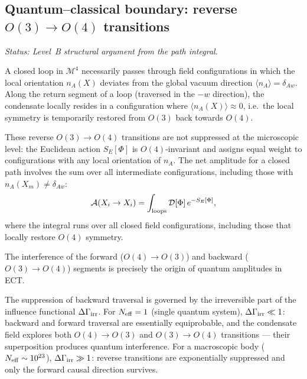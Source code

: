 \documentclass[11pt,a4paper]{article}
\numberwithin{equation}{section}
\begin{document}
\subsection{Quantum--classical boundary: reverse $O(3)\to O(4)$ transitions}
\label{sec:quantum_classical_boundary}

\textit{Status: Level~B structural argument from the path integral.}

A closed loop in $\mathcal{M}^4$ necessarily passes through field
configurations in which the local orientation $n_A(X)$ deviates from
the global vacuum direction $\langle n_A\rangle = \delta_{Aw}$.
Along the return segment of a loop (traversed in the $-w$ direction),
the condensate locally resides in a configuration where
$\langle n_A(X)\rangle\approx 0$, i.e.\ the local symmetry is
temporarily restored from $O(3)$ back towards $O(4)$.

These reverse $O(3)\!\to\!O(4)$ transitions are not suppressed at
the microscopic level: the Euclidean action $S_E[\Phi]$ is
$O(4)$-invariant and assigns equal weight to configurations with any
local orientation of $n_A$.
The net amplitude for a closed path involves the sum over
all intermediate configurations, including those with
$n_A(X_m) \neq \delta_{Aw}$:
\begin{equation}
  \label{eq:loop_sum_O4}
  \mathcal{A}(X_i \to X_i) = \int_{\rm loops} \mathcal{D}[\Phi]\,
  e^{-S_E[\Phi]},
\end{equation}
where the integral runs over all closed field configurations, including
those that locally restore $O(4)$ symmetry.

The interference of the forward ($O(4)\!\to\!O(3)$) and backward
($O(3)\!\to\!O(4)$) segments is precisely the origin of quantum
amplitudes in ECT.

The suppression of backward traversal is governed by the irreversible
part of the influence functional $\Delta\Gamma_{\rm irr}$.
For $N_{\rm eff}=1$ (single quantum system),
$\Delta\Gamma_{\rm irr}\ll1$:
backward and forward traversal are essentially equiprobable, and the
condensate field explores both $O(4)\!\to\!O(3)$ and
$O(3)\!\to\!O(4)$ transitions --- their superposition produces
quantum interference.
For a macroscopic body ($N_{\rm eff}\sim10^{23}$),
$\Delta\Gamma_{\rm irr}\gg1$:
reverse transitions are exponentially suppressed and only the forward
causal direction survives.
\end{document}
